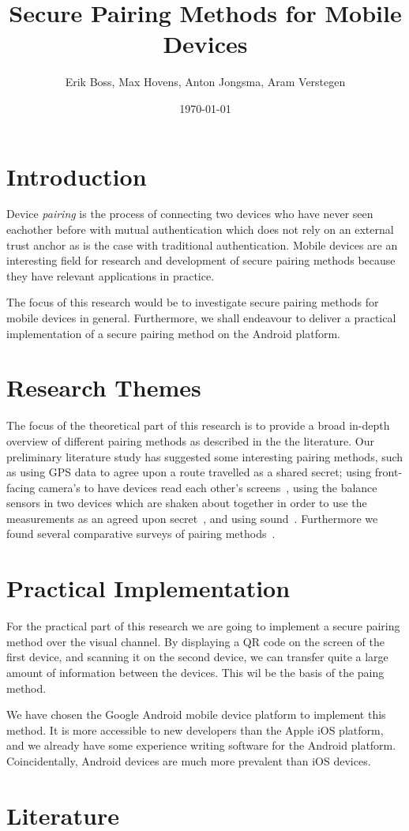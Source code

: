 \documentclass{article}
\title{Secure Pairing Methods for Mobile Devices}
\date{\today}
\author{Erik Boss, Max Hovens, Anton Jongsma, Aram Verstegen}
\begin{document}

\section{Introduction}

Device \textit{pairing} is the process of connecting two devices who have never seen eachother before with mutual authentication which does not rely on an external trust anchor as is the case with traditional authentication.
Mobile devices are an interesting field for research and development of secure pairing methods because they have relevant applications in practice.

The focus of this research would be to investigate secure pairing methods for mobile devices in general.
Furthermore, we shall endeavour to deliver a practical implementation of a secure pairing method on the Android platform.



\section{Research Themes}
The focus of the theoretical part of this research is to provide a broad in-depth overview of different pairing methods as described in the the literature. Our preliminary literature study has suggested some interesting pairing methods, such as using GPS data to agree upon a route travelled as a shared secret; %
using front-facing camera's to have devices read each other's screens~\cite{saxena2006secure},
using the balance sensors in two devices which are shaken about together in order to use the measurements as an agreed upon secret~\cite{mayrhofer2009shake}, and using sound~\cite{soriente2008hapadep}.
Furthermore we found several comparative surveys of pairing methods~\cite{kumar2009comparative}\cite{kobsa2009serial}\cite{uzun2007usability}.


\section{Practical Implementation}

For the practical part of this research we are going to implement a secure pairing method over the visual channel. By displaying a QR code on the screen of the first device, and scanning it on the second device, we can transfer quite a large amount of information between the devices. This wil be the basis of the paing method.

We have chosen the Google Android mobile device platform to implement this method.
It is more accessible to new developers than the Apple iOS platform, and we already have some experience writing software for the Android platform.
Coincidentally, Android devices are much more prevalent than iOS devices.

\section{Literature}



\end{document}
